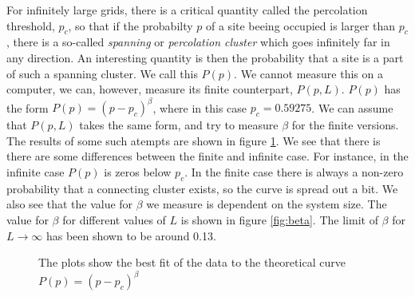 \documentclass[12pt]{article}
\begin{document}
For infinitely large grids, there is a critical quantity called the percolation threshold, $p_c$, so that if the probabilty $p$ of a site beeing occupied is larger than $p_c$, there is a so-called {\it spanning} or {\it percolation cluster} which goes infinitely far in any direction. An interesting quantity is then the probability that a site is a part of such a spanning cluster. We call this $P(p)$. We cannot measure this on a computer, we can, however, measure its finite counterpart, $P(p,L)$. $P(p)$ has the form $P(p) = (p-p_c)^\beta$, where in this case $p_c = 0.59275$. We can assume that $P(p,L)$ takes the same form, and try to measure $\beta$ for the finite versions. The results of some such atempts are shown in figure \ref{fig:2}. We see that there is there are some differences between the finite and infinite case. For instance, in the infinite case $P(p)$ is zeros below $p_c$. In the finite case there is always a non-zero probability that a connecting cluster exists, so the curve is spread out a bit. 
We also see that the value for $\beta$ we measure is dependent on the system size. The value for $\beta$ for different values of $L$ is shown in figure \ref{fig:beta}. The limit of $\beta$ for $L\rightarrow \infty $ has been shown to be around 0.13.

\begin{figure}[ht]
\centering
{}
\caption[Optional caption for list of figures]{The plots show the best fit of the data to the theoretical curve $P(p) = (p-p_c)^\beta$}
\label{fig:2}

\end{figure}
\end{document}
